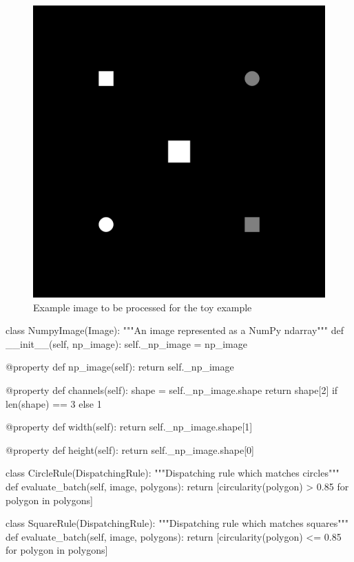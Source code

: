 \begin{figure}
	\center
	\includegraphics[scale=0.05]{image/toy_example.png}
	\caption{Example image to be processed for the toy example}
	\label{fig:toy_example}
\end{figure}

\begin{python}[label={lst:toy_image},caption={Toy example - Encapsulating custom image format}] 
class NumpyImage(Image):
    """An image represented as a NumPy ndarray"""
    def __init__(self, np_image):
        self._np_image = np_image

    @property
    def np_image(self):
        return self._np_image

    @property
    def channels(self):
        shape = self._np_image.shape
        return shape[2] if len(shape) == 3 else 1

    @property
    def width(self):
        return self._np_image.shape[1]

    @property
    def height(self):
        return self._np_image.shape[0]
\end{python}

\begin{python}[language=python,label={lst:toy_rules},caption={Toy example - Dispatching rules}] 
class CircleRule(DispatchingRule):
    """Dispatching rule which matches circles"""
    def evaluate_batch(self, image, polygons):
        return [circularity(polygon) > 0.85 for polygon in polygons]
        
class SquareRule(DispatchingRule):
    """Dispatching rule which matches squares"""
    def evaluate_batch(self, image, polygons):
        return [circularity(polygon) <= 0.85 for polygon in polygons]
\end{python}

